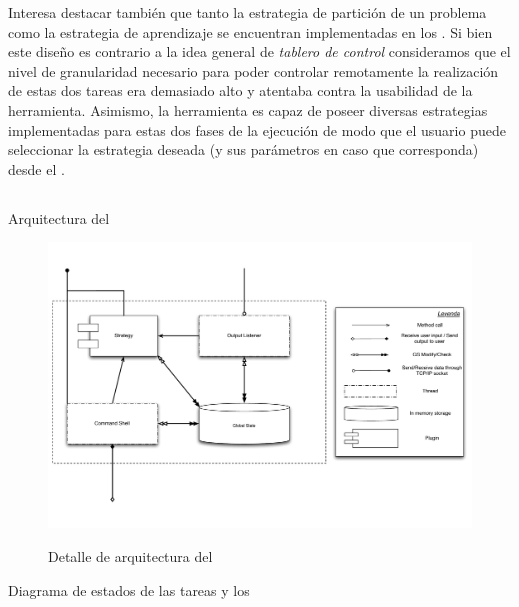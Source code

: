 Interesa destacar también que tanto la estrategia de partición de un problema
como la estrategia de aprendizaje se encuentran implementadas en los \ws. Si
bien este diseño es contrario a la idea general de \emph{tablero de control}
consideramos que el nivel de granularidad necesario para poder controlar
remotamente la realización de estas dos tareas era demasiado alto y atentaba
contra la usabilidad de la herramienta. Asimismo, la herramienta es capaz de
poseer diversas estrategias implementadas para estas dos fases de la ejecución
de modo que el usuario puede seleccionar la estrategia deseada (y sus
parámetros en caso que corresponda) desde el \fend.

\subsection{\fend}

Arquitectura del \fend

\begin{figure}[h!]
\includegraphics[scale=0.4]{graphs/frontend architecture}
\label{fig:frontend}
\caption{Detalle de arquitectura del \fend}
\end{figure}

Diagrama de estados de las tareas y los \ws


